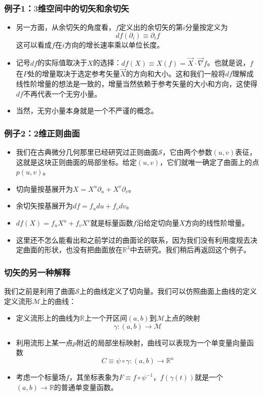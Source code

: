 \documentclass[CJK]{beamer}
\newcommand{\reals}{\mathbb{R}}
\newcommand{\mani}{\mathcal{M}}
\newcommand{\surface}{\mathcal{S}}
\begin{document}
\begin{frame}
\frametitle{\bch 例子1：$3$维空间中的切矢和余切矢 \ech}
\bch
\begin{itemize}
\item 另一方面，从余切矢的角度看，$f$定义出的余切矢的第$i$分量按定义为
$$
df(\partial_i) \equiv \partial_i f
$$
这可以看成$f$在$i$方向的增长速率乘以单位长度。
\item 记号$df$的实际值取决于$X$的选择：$df(X) \equiv X(f) = \vec X \cdot \vec \nabla f$。也就是说，$f$在$P$处的增量取决于选定参考矢量$\vec X$的方向和大小。这和我们一般将$df$理解成线性阶增量的想法是一致的，增量当然依赖于参考矢量的大小和方向，这使得$df$不再代表一个无穷小量。
\item 当然，无穷小量本身就是一个不严谨的概念。

\end{itemize}
\ech
\end{frame}


\begin{frame}
\frametitle{\bch 例子2：2维正则曲面 \ech}
\bch
\begin{itemize}
\item 我们在古典微分几何那里已经研究过正则曲面$\surface$，它由两个参数$(u,v)$表征，这就是这块正则曲面的局部坐标。给定$(u,v)$，它们就唯一确定了曲面上的点$p(u,v)$。
\item 切向量按基展开为$X = X^u \partial_u + X^v \partial_v$。
\item 余切矢按基展开为$df = f_u du + f_v dv$。
\item $df(X) = f_u X^u + f_v X^v$就是标量函数$f$沿给定切向量$X$方向的线性阶增量。
\item 这里还不怎么能看出和之前学过的曲面论的联系，因为我们没有利用度规去决定曲面的形状，也没有把曲面放在$\reals^3$中去研究。我们稍后再返回这个例子。
\end{itemize}
\ech
\end{frame}

\begin{frame}
\frametitle{\bch 切矢的另一种解释 \ech}
\bch
我们之前是利用了曲面$\surface$上的曲线定义了切向量。我们可以仿照曲面上曲线的定义定义流形$\mani$上的曲线：
\begin{itemize}
\item 定义流形上的曲线为$\reals$上一个开区间$(a,b)$到$\mani$上点的映射
$$
\gamma: (a,b) \to \mani
$$
\item 利用流形上某一点$p$附近的局部坐标映射，曲线可以表现为一个单变量向量函数
$$
C \equiv \psi \circ \gamma : (a,b) \to \reals^n
$$
\item 考虑一个标量场$f$，其坐标表象为$F\equiv f \circ \psi^{-1}$，$f(\gamma(t))$就是一个$(a,b) \to \reals$的普通单变量函数。
\end{itemize}
\ech
\end{frame}
\end{document}
